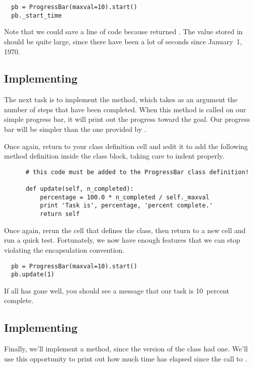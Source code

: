 \documentclass[letterpaper, 12pt, titlepage, twoside]{article}
\begin{document}
\begin{lstlisting}
  pb = ProgressBar(maxval=10).start()
  pb._start_time
\end{lstlisting}

Note that we could save a line of code because  returned .
The value stored in  should be quite large, since there have
been a lot of seconds since January~1, 1970.

\subsection*{Implementing }

The next task is to implement the  method, which takes as an
argument the number of steps that have been completed. When this method is
called on our simple progress bar, it will print out the progress toward the
goal. Our progress bar will be simpler than the one provided by
.

Once again, return to your class definition cell and \i{edit it to add the
  following method definition inside the class block}, taking care to indent
properly.

\begin{lstlisting}
      # this code must be added to the ProgressBar class definition!

      def update(self, n_completed):
          percentage = 100.0 * n_completed / self._maxval
          print 'Task is', percentage, 'percent complete.'
          return self
\end{lstlisting}

Once again, rerun the cell that defines the class, then return to a new cell
and run a quick test. Fortunately, we now have enough features that we can
stop violating the encapsulation convention.

\begin{lstlisting}
  pb = ProgressBar(maxval=10).start()
  pb.update(1)
\end{lstlisting}

If all has gone well, you should see a message that our task is 10~percent
complete.

\subsection*{Implementing }

Finally, we'll implement a  method, since the 
version of the class had one. We'll use this opportunity to print out how much
time has elapsed since the call to .
\end{document}
